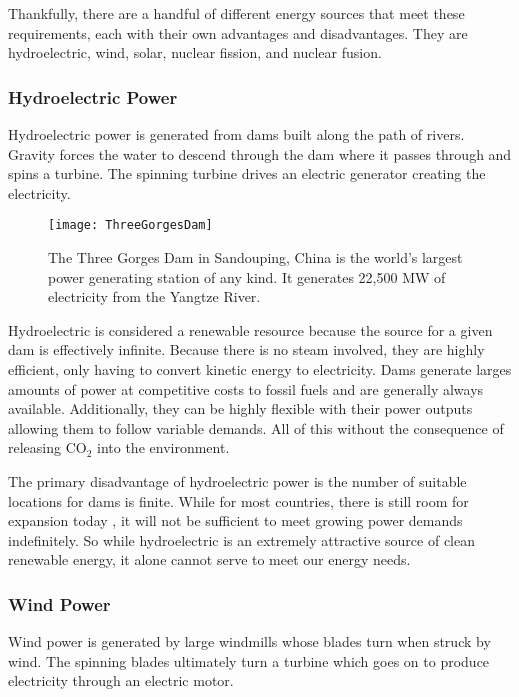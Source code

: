 	Thankfully, there are a handful of different energy sources that meet these requirements, each with their own advantages and disadvantages. They are hydroelectric, wind, solar, nuclear fission, and nuclear fusion. 
	
	\subsubsection{Hydroelectric Power}
	
		Hydroelectric power is generated from dams built along the path of rivers. Gravity forces the water to descend through the dam where it passes through and spins a turbine. The spinning turbine drives an electric generator creating the electricity.
		
		\begin{figure}[h!]
			\centering
			\texttt{[image: ThreeGorgesDam]}
			\caption[Three Gorges Dam]{The Three Gorges Dam in Sandouping, China is the world's largest power generating station of any kind. It generates 22,500 MW of electricity from the Yangtze River. \cite{Image_ThreeGorgesDam}}
		\end{figure}
	
		Hydroelectric is considered a renewable resource because the source for a given dam is effectively infinite. \cite{bibid} Because there is no steam involved, they are highly efficient, only having to convert kinetic energy to electricity. \cite{bibid} Dams generate larges amounts of power at competitive costs to fossil fuels \cite{bibid} and are generally always available. \cite{bibid} Additionally, they can be highly flexible with their power outputs allowing them to follow variable demands. \cite{bibid} All of this without the consequence of releasing CO$_2$ into the environment. \cite{bibid}
		
		The primary disadvantage of hydroelectric power is the number of suitable locations for dams is finite. \cite{bibid} While for most countries, there is still room for expansion today \cite{bibid}, it will not be sufficient to meet growing power demands indefinitely. So while hydroelectric is an extremely attractive source of clean renewable energy, it alone cannot serve to meet our energy needs.
		
	
	\subsubsection{Wind Power}
	
		Wind power is generated by large windmills whose blades turn when struck by wind. The spinning blades ultimately turn a turbine which goes on to produce electricity  through an electric motor. \cite{bibid}
		
